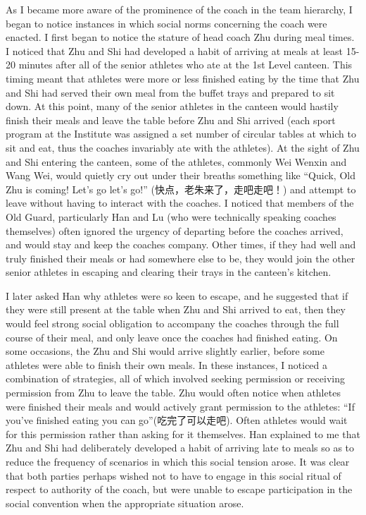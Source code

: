 \begin{CJK}{UTF8}{gbsn}
As I became more aware of the prominence of the coach in the team hierarchy, I began to notice instances in which social norms concerning the coach were enacted.  I first began to notice the stature of head coach Zhu during meal times.  I noticed that Zhu and Shi had developed a habit of arriving at meals at least 15-20 minutes after all of the senior athletes who ate at the 1st Level canteen.  This timing meant that athletes were more or less finished eating by the time that Zhu and Shi had served their own meal from the buffet trays and prepared to sit down.  At this point, many of the senior athletes in the canteen would hastily finish their meals and leave the table before Zhu and Shi arrived (each sport program at the Institute was assigned a set number of circular tables at which to sit and eat, thus the coaches invariably ate with the athletes). At the sight of Zhu and Shi entering the canteen, some of the athletes, commonly Wei Wenxin and Wang Wei, would quietly cry out under their breaths something like ``Quick, Old Zhu is coming!  Let's go let's go!'' (快点，老朱来了，走吧走吧！) and attempt to leave without having to interact with the coaches.  I noticed that members of the Old Guard, particularly Han and Lu (who were technically speaking coaches themselves) often ignored the urgency of departing before the coaches arrived, and would stay and keep the coaches company. Other times, if they had well and truly finished their meals or had somewhere else to be, they would join the other senior athletes in escaping and clearing their trays in the canteen's kitchen.

I later asked Han why athletes were so keen to escape, and he suggested that if they were still present at the table when Zhu and Shi arrived to eat, then they would feel strong social obligation to accompany the coaches through the full course of their meal, and only leave once the coaches had finished eating.  On some occasions, the Zhu and Shi would arrive slightly earlier, before some athletes were able to finish their own meals.  In these instances, I noticed a combination of strategies, all of which involved seeking permission or receiving permission from Zhu to leave the table.  Zhu would often notice when athletes were finished their meals and would actively grant permission to the athletes: ``If you've finished eating you can go''(吃完了可以走吧).  Often athletes would wait for this permission rather than asking for it themselves.  Han explained to me that Zhu and Shi had deliberately developed a habit of arriving late to meals so as to reduce the frequency of scenarios in which this social tension arose.  It was clear that both parties perhaps wished not to have to engage in this social ritual of respect to authority of the coach, but were unable to escape participation in the social convention when the appropriate situation arose.


\end{CJK}
